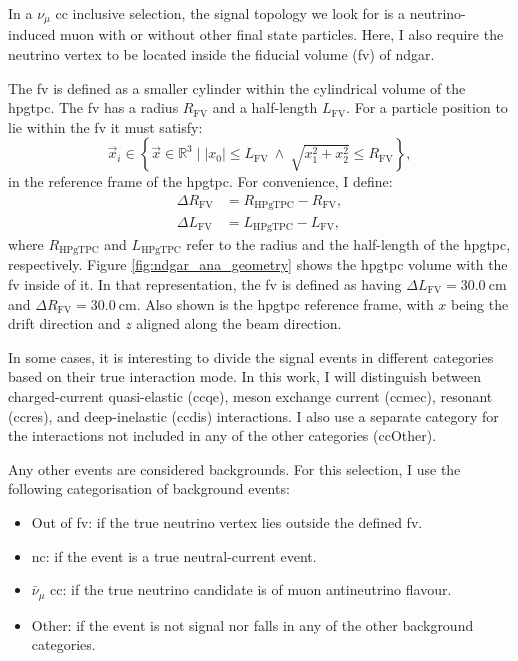 In a $\nu_{\mu}$ \gls{cc} inclusive selection, the signal topology we look for is a neutrino-induced muon with or without other final state particles. Here, I also require the neutrino vertex to be located inside the fiducial volume (\gls{fv}) of \gls{ndgar}.

The \gls{fv} is defined as a smaller cylinder within the cylindrical volume of the \gls{hpgtpc}. The \gls{fv} has a radius $R_{\mathrm{FV}}$ and a half-length $L_{\mathrm{FV}}$. For a particle position to lie within the \gls{fv} it must satisfy:
\begin{equation}
    \vec{x}_{i} \in \left\{\vec{x} \in \mathbb{R}^{3} \mid |x_{0}| \leq L_{\mathrm{FV}} ~ \land ~ \sqrt{x_{1}^{2}+x_{2}^{2}} \leq R_{\mathrm{FV}}\right\},
\end{equation}
in the reference frame of the \gls{hpgtpc}. For convenience, I define:
\begin{equation}
    \begin{split}
        \Delta R_{\mathrm{FV}} &= R_{\mathrm{HPgTPC}} - R_{\mathrm{FV}}, \\
        \Delta L_{\mathrm{FV}} &= L_{\mathrm{HPgTPC}} - L_{\mathrm{FV}},
    \end{split}
\end{equation}
where $R_{\mathrm{HPgTPC}}$ and $L_{\mathrm{HPgTPC}}$ refer to the radius and the half-length of the \gls{hpgtpc}, respectively. Figure \ref{fig:ndgar_ana_geometry} shows the \gls{hpgtpc} volume with the \gls{fv} inside of it. In that representation, the \gls{fv} is defined as having $\Delta L_{\mathrm{FV}} = 30.0 ~ \mathrm{cm}$ and $\Delta R_{\mathrm{FV}} = 30.0 ~ \mathrm{cm}$. Also shown is the \gls{hpgtpc} reference frame, with $x$ being the drift direction and $z$ aligned along the beam direction.

In some cases, it is interesting to divide the signal events in different categories based on their true interaction mode. In this work, I will distinguish between charged-current quasi-elastic (\gls{cc}\gls{qe}), meson exchange current (\gls{cc}\gls{mec}), resonant (\gls{cc}\gls{res}), and deep-inelastic (\gls{cc}\gls{dis}) interactions. I also use a separate category for the interactions not included in any of the other categories (\gls{cc}Other).

Any other events are considered backgrounds. For this selection, I use the following categorisation of background events:
\begin{itemize}
    \item Out of \gls{fv}: if the true neutrino vertex lies outside the defined \gls{fv}.
    \item \gls{nc}: if the event is a true neutral-current event.
    \item $\bar{\nu}_{\mu}$ \gls{cc}: if the true neutrino candidate is of muon antineutrino flavour.
    \item Other: if the event is not signal nor falls in any of the other background categories.
\end{itemize}

